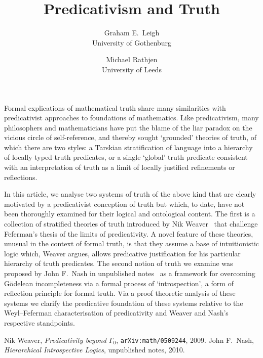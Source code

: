 \documentclass[UKenglish]{scrartcl}
\title{Predicativism and Truth}
\author{Graham E.~Leigh\\\normalsize University of Gothenburg \and Michael Rathjen\\\normalsize University of Leeds}
\begin{document}
\maketitle
\thispagestyle{empty}

Formal explications of mathematical truth share many similarities with predicativist approaches to foundations of mathematics. 
Like predicativism, many philosophers and mathematicians have put the blame of the liar paradox on the vicious circle of self-reference, and thereby sought `grounded' theories of truth, of which there are two styles: a Tarskian stratification of language into a hierarchy of locally typed truth predicates, or a single `global' truth predicate consistent with an interpretation of truth as a limit of locally justified refinements or reflections.

In this article, we analyse two systems of truth of the above kind that are clearly motivated by a predicativist conception of truth but which, to date, have not been thoroughly examined for their logical and ontological content.
The first is a collection of stratified theories of truth introduced by Nik Weaver~\cite{Wea:pred} that challenge Feferman's thesis of the limits of predicativity.
A novel feature of these theories, unusual in the context of formal truth, is that they assume a base of intuitionistic logic which, Weaver argues, allows predicative justification for his particular hierarchy of truth predicates.
The second notion of truth we examine was proposed by John F.\ Nash in unpublished notes~\cite{Nash} as a framework for overcoming G\"odelean incompleteness via a formal process of `introspection', a form of reflection principle for formal truth.
Via a proof theoretic analysis of these systems we clarify the predicative foundation of these systems relative to the Weyl--Feferman characterisation of predicativity and Weaver and Nash's respective standpoints.

\begin{thebibliography}{2}
	 Nik Weaver, \textit{Predicativity beyond \( \Gamma_0 \)}, \texttt{arXiv:math/0509244}, 2009.
	 John F.~Nash, \textit{Hierarchical Introspective Logics}, unpublished notes, 2010.
\end{thebibliography}
\end{document}
